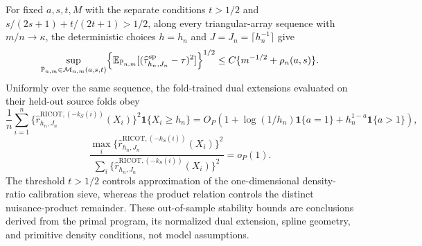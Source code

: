 For fixed \(a,s,t,M\) with the separate conditions \(t>1/2\) and \(s/(2s+1)+t/(2t+1)>1/2\), along every triangular-array sequence with \(m/n\to\kappa\), the deterministic choices \(h=h_n\) and \(J=J_n=\lceil h_n^{-1}\rceil\) give \[\sup_{\mathbb P_{n,m}\in\mathcal M_{n,m}(a,s,t)}\Bigl\{\mathbb E_{\mathbb P_{n,m}}[(\widehat\tau^{\mathrm{sp}}_{h_n,J_n}-\tau)^2]\Bigr\}^{1/2}\le C\{m^{-1/2}+\rho_n(a,s)\}.\] Uniformly over the same sequence, the fold-trained dual extensions evaluated on their held-out source folds obey \[\frac1n\sum_{i=1}^n\{\widehat r^{\mathrm{RICOT},(-k_S(i))}_{h_n,J_n}(X_i)\}^2\mathbf 1\{X_i\ge h_n\}=O_P\!\left(1+\log(1/h_n)\mathbf 1\{a=1\}+h_n^{1-a}\mathbf 1\{a>1\}\right),\] \[\frac{\max_i\{\widehat r^{\mathrm{RICOT},(-k_S(i))}_{h_n,J_n}(X_i)\}^2}{\sum_i\{\widehat r^{\mathrm{RICOT},(-k_S(i))}_{h_n,J_n}(X_i)\}^2}=o_P(1).\] The threshold \(t>1/2\) controls approximation of the one-dimensional density-ratio calibration sieve, whereas the product relation controls the distinct nuisance-product remainder. These out-of-sample stability bounds are conclusions derived from the primal program, its normalized dual extension, spline geometry, and primitive density conditions, not model assumptions.